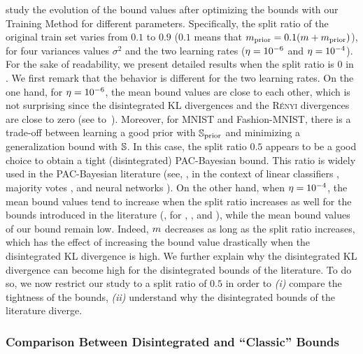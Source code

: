  study the evolution of the bound values after optimizing the bounds with our Training Method for different parameters.
Specifically, the split ratio of the original train set varies from $0.1$ to $0.9$ ($0.1$ means that $\m_{\text{prior}}= 0.1(\m+\m_{\text{prior}})$), for four variances values $\sigma^2$ and the two learning rates ($\lr=10^{-6}$ and $\lr=10^{-4}$).
For the sake of readability, we present detailed results when the split ratio is $0$ in .
We first remark that the behavior is different for the two learning rates. 
On the one hand, for $\lr=10^{-6}$, the mean bound values are close to each other, which is not surprising since the disintegrated KL divergences and the \textsc{Rényi} divergences are close to zero (see  to~). 
Moreover, for MNIST and Fashion-MNIST, there is a trade-off between learning a good prior with $\S_{\text{prior}}$ and minimizing a generalization bound with $\S$.
In this case, the split ratio $0.5$ appears to be a good choice to obtain a tight (disintegrated) PAC-Bayesian bound. 
This ratio is widely used in the PAC-Bayesian literature (see, \eg, in the context of linear classifiers \citep{GermainLacasseLavioletteMarchand2009}, majority votes \citep{ZantedeschiViallardMorvantEmonetHabrardGermainGuedj2021}, and neural networks
\citep{LetarteGermainGuedjLaviolette2019,PerezOrtizRivasplataShaweTaylorSzepesvari2021}).
On the other hand, when $\lr=10^{-4}$, the mean bound values tend to increase when the split ratio increases as well for the bounds introduced in the literature (\ie, for \algoblanchard, \algocatoni, and \algorivasplata), while the mean bound values of our bound remain low.
Indeed, $\m$ decreases as long as the split ratio increases, which has the effect of increasing the bound value drastically when the disintegrated KL divergence is high.
We further explain why the disintegrated KL divergence can become high for the disintegrated bounds of the literature.
To do so, we now restrict our study to a split ratio of $0.5$ in order to {\it (i)} compare the tightness of the bounds, {\it (ii)} understand why the disintegrated bounds of the literature diverge.

\subsubsection{Comparison Between Disintegrated and ``Classic'' Bounds}

